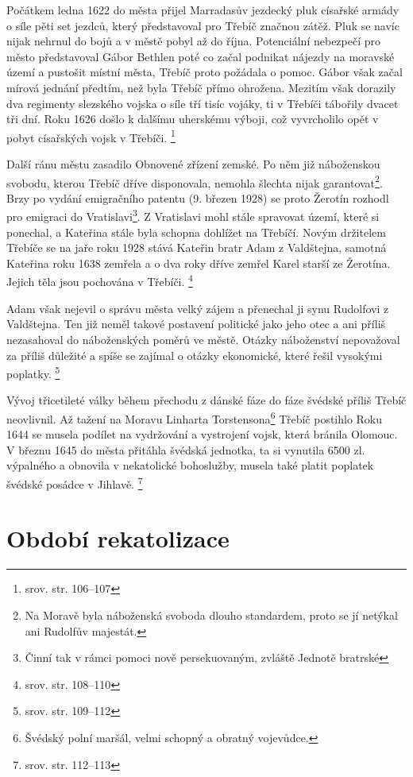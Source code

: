 \documentclass[a4paper,oneside,12pt]{report}
\begin{document}
Počátkem ledna 1622 do města přijel Marradasův jezdecký pluk císařské armády o síle pěti set jezdců, který představoval pro Třebíč značnou zátěž.
Pluk se navíc nijak nehrnul do bojů a v městě pobyl až do října.
Potenciální nebezpečí pro město představoval Gábor Bethlen poté co začal podnikat nájezdy na moravské území a pustošit místní města, Třebíč proto požádala o pomoc.
Gábor však začal mírová jednání předtím, než byla Třebíč přímo ohrožena.
Mezitím však dorazily dva regimenty slezského vojska o síle tří tisíc vojáky, ti v Třebíči tábořily dvacet tři dní.
Roku 1626 došlo k dalšímu uherskému výboji, což vyvrcholilo opět v pobyt císařských vojsk v Třebíči. \footnote{srov. \cite{Uhlir1978} str. 106--107}

Další ránu městu zasadilo Obnovené zřízení zemské.
Po něm již náboženskou svobodu, kterou Třebíč dříve disponovala, nemohla šlechta nijak garantovat\footnote{Na Moravě byla náboženská svoboda dlouho standardem, proto se jí netýkal ani Rudolfův majestát.}.
Brzy po vydání emigračního patentu (9. březen 1928) se proto Žerotín rozhodl pro emigraci do Vratislavi\footnote{Činní tak v rámci pomoci nově persekuovaným, zvláště Jednotě bratrské}.
Z Vratislavi mohl stále spravovat území, které si ponechal, a Kateřina stále byla schopna dohlížet na Třebíčí.
Novým držitelem Třebíče se na jaře roku 1928 stává Kateřin bratr Adam z Valdštejna, samotná Kateřina roku 1638 zemřela a o dva roky dříve zemřel Karel starší ze Žerotína. %
Jejich těla jsou pochována v Třebíči. \footnote{srov. \cite{Uhlir1978} str. 108--110}

Adam však nejevil o správu města velký zájem a přenechal ji synu Rudolfovi z Valdštejna.
Ten již neměl takové postavení politické jako jeho otec a ani příliš nezasahoval do náboženských poměrů ve městě.
Otázky náboženství nepovažoval za příliš důležité a spíše se zajímal o otázky ekonomické, které řešil vysokými poplatky. \footnote{srov. \cite{Uhlir1978} str. 109--112}

Vývoj třicetileté války během přechodu z dánské fáze do fáze švédské příliš Třebíč neovlivnil.
Až tažení na Moravu Linharta Torstensona\footnote{Švédský polní maršál, velmi schopný a obratný vojevůdce.} Třebíč postihlo
Roku 1644 se musela podílet na vydržování a vystrojení vojsk, která bránila Olomouc.
V březnu 1645 do města přitáhla švédská jednotka, ta si vynutila 6500 zl. výpalného a obnovila v nekatolické bohoslužby, musela také platit poplatek švédské posádce v Jihlavě. \footnote{srov. \cite{Uhlir1978} str. 112--113}

\section{Období rekatolizace}
\end{document}
